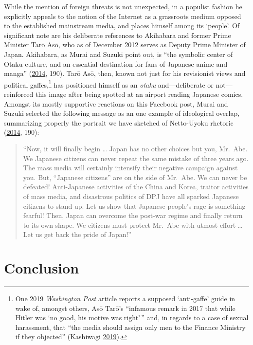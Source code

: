 \documentclass[10pt,british,A4paper,oneside]{memoir}
\begin{document}
While the mention of foreign threats is not unexpected, in a populist
fashion he explicitly appeals to the notion of the Internet as a
grassroots medium opposed to the established mainstream media, and
places himself among its `people'. Of significant note are his
deliberate references to Akihabara and former Prime Minister Tarō Asō,
who as of December 2012 serves as Deputy Prime Minister of Japan.
Akihabara, as Murai and Suzuki point out, is ``the symbolic center of
Otaku culture, and an essential destination for fans of Japanese anime
and manga'' (\protect\hyperlink{ref-hollihan_how_2014}{2014}, 190). Tarō
Asō, then, known not just for his revisionist views and political
gaffes,\footnote{One 2019 \emph{Washington Post} article reports a
  supposed `anti-gaffe' guide in wake of, amongst others, Asō Tarō's
  ``infamous remark in 2017 that while Hitler was `no good, his motive
  was right'\,'' and, in regards to a case of sexual harassment, that
  ``the media should assign only men to the Finance Ministry if they
  objected'' (Kashiwagi
  \protect\hyperlink{ref-kashiwagi_japan_2019}{2019}).} has positioned
himself as an \emph{otaku} and---deliberate or not---reinforced this
image after being spotted at an airport reading Japanese comics. Amongst
its mostly supportive reactions on this Facebook post, Murai and Suzuki
selected the following message as an one example of ideological overlap,
summarizing properly the portrait we have sketched of Netto-Uyoku
rhetoric (\protect\hyperlink{ref-hollihan_how_2014}{2014}, 190):

\begin{quote}
``Now, it will finally begin \ldots{} Japan has no other choices but
you, Mr.~Abe. We Japanese citizens can never repeat the same mistake of
three years ago. The mass media will certainly intensify their negative
campaign against you. But, ``Japanese citizens'' are on the side of
Mr.~Abe. We can never be defeated! Anti-Japanese activities of the China
and Korea, traitor activities of mass media, and disastrous politics of
DPJ have all sparked Japanese citizens to stand up. Let us show that
Japanese people's rage is something fearful! Then, Japan can overcome
the post-war regime and finally return to its own shape. We citizens
must protect Mr.~Abe with utmost effort \ldots{} Let us get back the
pride of Japan!''
\end{quote}

\section{Conclusion}\label{conclusion}
\end{document}
